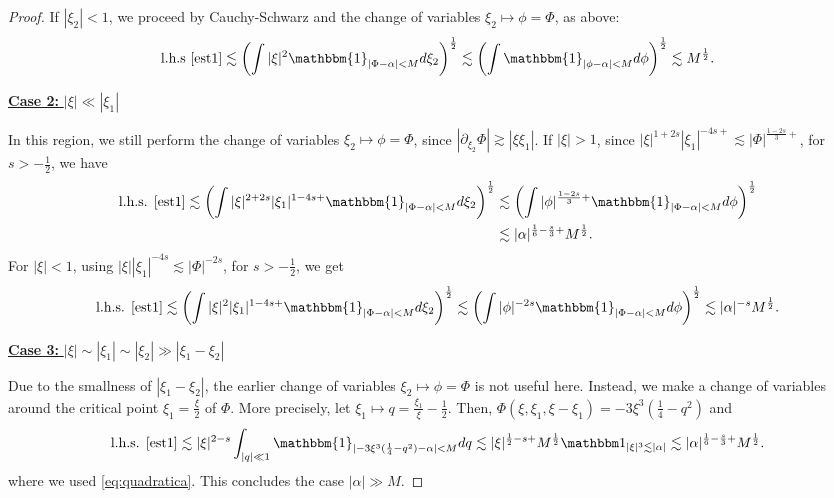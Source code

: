 \documentclass[a4paper,
11pt,  reqno]{amsart}
\newcommand{\fia}{\mathbbm{1}_{|\Phi-\alpha|<M}}
\newcommand{\5}{\textup{V}}
\newcommand{\noi}{\noindent}
\newcommand{\ind}{\mathbbm 1}
\newcommand{\les}{\lesssim}
\theoremstyle{remark}
\newcommand{\al}{\alpha}
\numberwithin{equation}{section}
\numberwithin{theorem}{section}
\begin{document}
\begin{proof}
\noi 
If $|\xi_2|<1$, we proceed by Cauchy-Schwarz and the change of variables $\xi_2 \mapsto \phi= \Phi$, as above:
\begin{align*}
\text{l.h.s \eqref{est1}}
\les 
\left(\int |\xi|^2\fia d\xi_2\right)^\frac12\lesssim \left(\int \mathbbm{1}_{|\phi-\alpha|<M} d\phi\right)^\frac12\lesssim M^{\frac12}.
\end{align*}

\smallskip

\noi
\underline{\textbf{Case 2:} $|\xi| \ll |\xi_1|$} 

In this region, we still perform the change of variables $\xi_2\mapsto \phi=\Phi$, since $|\partial_{\xi_2}\Phi|\gtrsim |\xi\xi_1|$. If $|\xi|>1$, since $|\xi|^{1+2s}|\xi_1|^{-4s+}\lesssim |\Phi|^{\frac{1-2s}{3}+} $,  for $s>-\frac12$,  we have
\begin{align*}
\text{l.h.s. \eqref{est1}}
\lesssim \left(\int |\xi|^{2+2s}|\xi_1|^{1-4s+}\fia d\xi_2\right)^\frac12
& \lesssim \left(\int |\phi|^{\frac{1-2s}{3}+}\fia d\phi\right)^\frac12
\\
&
\lesssim |\alpha|^{\frac16 - \frac s3 +} M^{\frac12}.
\end{align*}
For $|\xi|<1$, using $|\xi||\xi_1|^{-4s}\lesssim |\Phi|^{-2s}$,  for $s>-\frac12$, we get
\begin{align*}
    \text{l.h.s. \eqref{est1}}
    \les 
    \left(\int |\xi|^{2}|\xi_1|^{1-4s+}\fia d\xi_2\right)^\frac12
    \lesssim \left(\int |\phi|^{-2s}\fia d\phi\right)^\frac12\lesssim |\alpha|^{-s} M^{\frac12}.
\end{align*}



\smallskip

\noi
\underline{\textbf{Case 3:} 
$|\xi|\sim|\xi_1| \sim |\xi_2| \gg |\xi_1 - \xi_2|$}




Due to the smallness of $|\xi_1-\xi_2|$, 
the earlier change of variables $\xi_2\mapsto \phi = \Phi$ is not useful here. 
Instead,
we make a change of variables around the critical point $\xi_1 = \frac\xi2$ of $\Phi$. More precisely, let $\xi_1 \mapsto q = \frac{\xi_1}{\xi} - \frac12$. Then, $\Phi (\xi, \xi_1,\xi-\xi_1)=  -3 \xi^3 (\frac14 - q^2)$ and 
\begin{align*}
\text{l.h.s. \eqref{est1}}
\les 
|\xi|^{2-s}\int_{|q| \ll 1} \mathbbm{1}_{|-3 \xi^3 (\frac14 - q^2)-\alpha|<M}dq \les |\xi|^{\frac12-s +} M^\frac12  \ind_{|\xi|^3 \les |\al|}
\les |\alpha|^{\frac16-\frac s3+} M^\frac12. 
\end{align*}
where we used \eqref{eq:quadratica}. 
This concludes the case $|\alpha|\gg M$. 


\end{proof}
\end{document}
